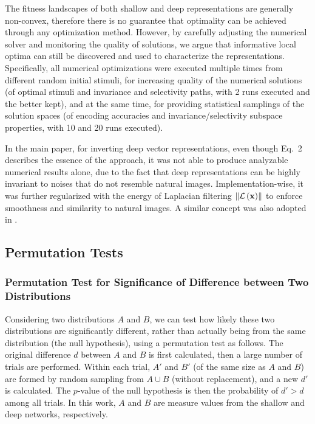 \documentclass{article} %
\begin{document}
The fitness landscapes of both shallow and deep representations are generally non-convex, therefore there is no guarantee that optimality can be achieved through any optimization method.
However, by carefully adjusting the numerical solver and monitoring the quality of solutions, we argue that informative local optima can still be discovered and used to characterize the representations.
Specifically, all numerical optimizations {were} executed multiple times from different random initial stimuli, for increasing quality of the numerical solutions (of optimal stimuli and invariance and selectivity paths, with 2 runs executed and the better kept), and at the same time, for providing statistical samplings of the solution spaces (of encoding accuracies and invariance/selectivity subspace properties, with 10 and 20 runs executed).

In the main paper, for inverting deep vector representations, even though Eq.~2  describes the essence of the approach, it was not able to produce analyzable numerical results alone, due to the fact that deep representations can be highly invariant to noises that do not resemble natural images.
Implementation-wise, it was further regularized with the energy of Laplacian filtering $\left\| \mathcal{L} \left( \bf{x} \right) \right\|$ to enforce smoothness and similarity to natural images.
A similar concept was also adopted in \cite{mahendran2014understanding}.

\subsection{Permutation Tests}

\subsubsection{Permutation Test for Significance of Difference between Two Distributions}

Considering two distributions $A$ and $B$, we can test how likely these two distributions are significantly different, rather than actually being from the same distribution (the null hypothesis), using a permutation test as follows. The original difference $d$ between $A$ and $B$ is first calculated, then a large number of trials are performed. Within each trial, $A'$ and $B'$ (of the same size as $A$ and $B$) are formed by random sampling from $A \cup B$ (without replacement), and a new $d'$ is calculated. The $p$-value of the null hypothesis is then the probability of $d' > d$ among all trials. In this work, $A$ and $B$ are measure values from the shallow and deep networks, respectively.
\end{document}
